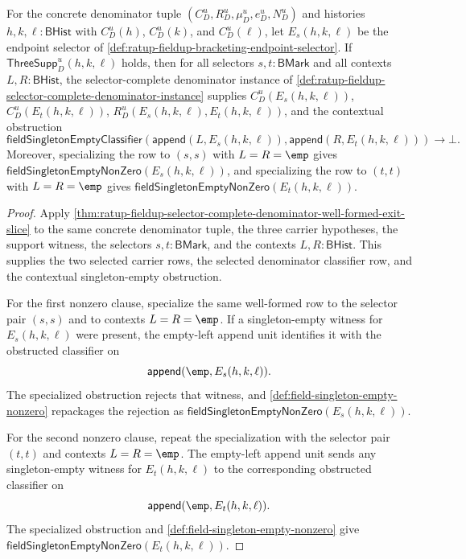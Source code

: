 \begin{theorem}
\label{thm:ratup-fieldup-selector-complete-denominator-laws}
For the concrete denominator tuple $(C_D^u,R_D^u,\mu_D^u,e_D^u,N_D^u)$ and
histories $h,k,\ell:\mathsf{BHist}$ with $C_D^u(h)$, $C_D^u(k)$, and
$C_D^u(\ell)$, let $E_s(h,k,\ell)$ be the endpoint selector of
\autoref{def:ratup-fieldup-bracketing-endpoint-selector}. If
$\mathsf{ThreeSupp}_D^u(h,k,\ell)$ holds, then for all selectors
$s,t:\mathsf{BMark}$ and all contexts $L,R:\mathsf{BHist}$, the
selector-complete denominator instance of
\autoref{def:ratup-fieldup-selector-complete-denominator-instance} supplies
$C_D^u(E_s(h,k,\ell))$, $C_D^u(E_t(h,k,\ell))$,
$R_D^u(E_s(h,k,\ell),E_t(h,k,\ell))$, and the contextual obstruction
$$
\mathsf{fieldSingletonEmptyClassifier}
(\mathsf{append}(L,E_s(h,k,\ell)),\mathsf{append}(R,E_t(h,k,\ell)))\to\bot.
$$
Moreover, specializing the row to $(s,s)$ with $L=R=\emp$ gives
$\mathsf{fieldSingletonEmptyNonZero}(E_s(h,k,\ell))$, and specializing the row
to $(t,t)$ with $L=R=\emp$ gives
$\mathsf{fieldSingletonEmptyNonZero}(E_t(h,k,\ell))$.
\end{theorem}
\begin{proof}
Apply
\autoref{thm:ratup-fieldup-selector-complete-denominator-well-formed-exit-slice}
to the same concrete denominator tuple, the three carrier hypotheses, the
support witness, the selectors $s,t:\mathsf{BMark}$, and the contexts
$L,R:\mathsf{BHist}$. This supplies the two selected carrier rows, the
selected denominator classifier row, and the contextual singleton-empty
obstruction.

For the first nonzero clause, specialize the same well-formed row to the
selector pair $(s,s)$ and to contexts $L=R=\emp$. If a singleton-empty witness
for $E_s(h,k,\ell)$ were present, the empty-left append unit identifies it with
the obstructed classifier on
$$
\mathsf{append}(\emp,E_s(h,k,\ell)).
$$
The specialized obstruction rejects that witness, and
\autoref{def:field-singleton-empty-nonzero} repackages the rejection as
$\mathsf{fieldSingletonEmptyNonZero}(E_s(h,k,\ell))$.

For the second nonzero clause, repeat the specialization with the selector
pair $(t,t)$ and contexts $L=R=\emp$. The empty-left append unit sends any
singleton-empty witness for $E_t(h,k,\ell)$ to the corresponding obstructed
classifier on
$$
\mathsf{append}(\emp,E_t(h,k,\ell)).
$$
The specialized obstruction and
\autoref{def:field-singleton-empty-nonzero} give
$\mathsf{fieldSingletonEmptyNonZero}(E_t(h,k,\ell))$.
\end{proof}

